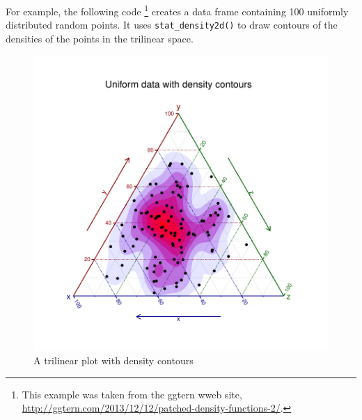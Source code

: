 \documentclass[11pt]{book}
\renewenvironment{knitrout}{\small\renewcommand{\baselinestretch}{.85}}{} %
\begin{document}
For example, the following code%
\footnote{
This example was taken from the ggtern wweb site,
\url{http://ggtern.com/2013/12/12/patched-density-functions-2/}.
}
creates a data frame
 containing 100 uniformly distributed
random points.  It uses \verb|stat_density2d()|
to draw contours of the densities of the points in the
trilinear space.
\begin{knitrout}
\color{fgcolor}\begin{kframe}
\begin{alltt}
\hlstd{(}\hlstd{)}
 \hlkwb{<-} \hlstd{(} \hlstd{=} \hlstd{(}\hlstd{),}
                    \hlstd{=} \hlstd{(}\hlstd{),}
                    \hlstd{=} \hlstd{(}\hlstd{))}
 \hlkwb{<-} \hlstd{(} 
 \hlopt{+} \hlstd{(} \hlstd{=} \hlstd{,}  
                       \hlstd{=} \hlstd{,}  \hlstd{=} \hlstd{,}
                      \hlstd{(} 
                            \hlopt{+}
    \hlstd{()} \hlopt{+}
    \hlstd{()} \hlopt{+}
    \hlstd{(} \hlstd{=} \hlstd{)}    \hlopt{+}
    \hlstd{(} \hlstd{=} \hlstd{,} \hlstd{=} \hlstd{)}  \hlopt{+}
    \hlstd{(} \hlstd{=} \hlstd{,}  \hlstd{=} \hlstd{,}  \hlstd{=} \hlstd{)}
\end{alltt}
\end{kframe}\begin{figure}[!htbp]


\centerline{\includegraphics[width=.6\textwidth,trim=20 20 20 20,clip]{ch04/fig/ggterm-demo} }

\caption[A trilinear plot with density contours]{A trilinear plot with density contours\label{fig:ggterm-demo}}
\end{figure}


\end{knitrout}
\end{document}

